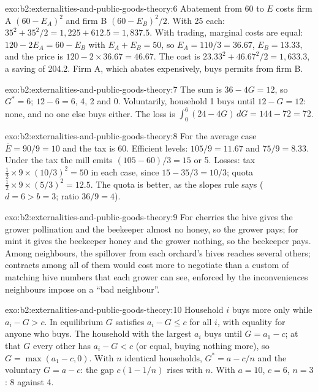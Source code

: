 \begin{solution}{exo:b2:externalities-and-public-goods-theory:6}
Abatement from 60 to $E$ costs firm A $(60 - E_A)^2$ and firm B $(60 - E_B)^2/2$. With 25 each: $35^2 + 35^2/2 = 1{,}225 + 612.5 = 1{,}837.5$. With trading,
marginal costs are equal: $120 - 2E_A = 60 - E_B$ with $E_A + E_B = 50$, so $E_A = 110/3 = 36.67$, $E_B = 13.33$, and the price is $120 - 2 \times 36.67 = 46.67$. The
cost is $23.33^2 + 46.67^2/2 = 1{,}633.3$, a saving of 204.2. Firm A, which abates expensively, buys permits from firm B.
\end{solution}

\begin{solution}{exo:b2:externalities-and-public-goods-theory:7}
The sum is $36 - 4G = 12$, so $G^* = 6$;  $12 - 6 = 6$, 4, 2 and 0. Voluntarily, household 1 buys until $12 - G = 12$: none, and
no one else buys either. The loss is $\int_0^6 (24 - 4G)\,dG = 144 - 72 = 72$.
\end{solution}

\begin{solution}{exo:b2:externalities-and-public-goods-theory:8}
For the average case $\bar E = 90/9 = 10$ and the tax is 60. Efficient levels: $105/9 = 11.67$ and $75/9 = 8.33$. Under the tax the mill emits
$(105 - 60)/3 = 15$ or 5. Losses: tax $\tfrac12 \times 9 \times (10/3)^2 = 50$ in each case, since $15 - 35/3 = 10/3$; quota $\tfrac12 \times 9 \times (5/3)^2 = 12.5$. The quota is better, as the
slopes rule says ($d = 6 > b = 3$; ratio $36/9 = 4$).
\end{solution}

\begin{solution}{exo:b2:externalities-and-public-goods-theory:9}
For cherries the hive gives the grower pollination and the beekeeper almost no honey, so the grower pays; for mint it gives
the beekeeper honey and the grower nothing, so the beekeeper pays. Among neighbours, the spillover from each orchard's
hives reaches several others; contracts among all of them would cost more to negotiate than a custom of matching hive
numbers that each grower can see, enforced by the inconveniences neighbours impose on a ``bad neighbour''.
\end{solution}

\begin{solution}{exo:b2:externalities-and-public-goods-theory:10}
Household $i$ buys more only while $a_i - G > c$. In equilibrium $G$ satisfies $a_i - G \le c$ for all $i$, with equality for anyone who buys. The
household with the largest $a_i$ buys until $G = a_1 - c$; at that $G$ every other has $a_i - G < c$ (or equal, buying nothing more), so $G = \max(a_1 - c, 0)$.
With $n$ identical households, $G^* = a - c/n$ and the voluntary $G = a - c$: the gap $c(1 - 1/n)$ rises with $n$. With $a = 10$, $c = 6$, $n = 3$: 8 against 4.
\end{solution}

